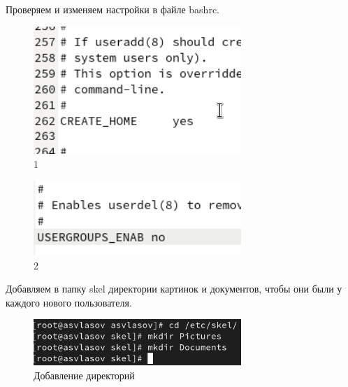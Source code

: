 \documentclass[
  12pt,
  a4paper,
  DIV=11,
  numbers=noendperiod]{scrreprt}
\begin{document}
Проверяем и изменяем настройки в файле bashrc.

\begin{figure}

{\centering \includegraphics[width=0.7\textwidth,height=\textheight]{image/6.png}

}

\caption{1}

\end{figure}%
\begin{figure}

{\centering \includegraphics[width=0.7\textwidth,height=\textheight]{image/7.png}

}

\caption{2}

\end{figure}%

Добавляем в папку skel директории картинок и документов, чтобы они были
у каждого нового пользователя.

\begin{figure}

{\centering \includegraphics[width=0.7\textwidth,height=\textheight]{image/8.png}

}

\caption{Добавление директорий}

\end{figure}%
\end{document}
